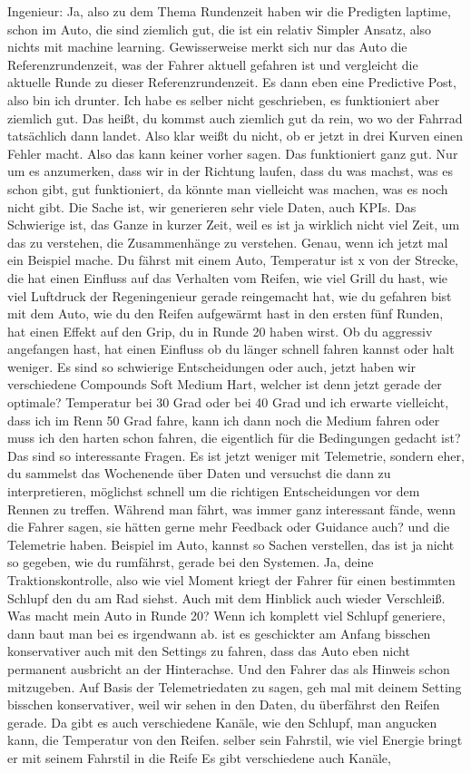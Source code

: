 Ingenieur: 
Ja, also zu dem Thema Rundenzeit haben wir die Predigten laptime, schon im Auto, die sind ziemlich gut, die ist ein relativ Simpler Ansatz, also nichts mit machine learning. Gewisserweise merkt sich nur das Auto die Referenzrundenzeit, was der Fahrer aktuell gefahren ist und vergleicht die aktuelle Runde zu dieser Referenzrundenzeit.  Es dann eben eine Predictive Post, also bin ich drunter. Ich habe es selber nicht geschrieben, es funktioniert aber ziemlich gut.  Das heißt, du kommst auch ziemlich gut da rein, wo  wo der Fahrrad tatsächlich dann landet. Also klar weißt du nicht, ob er jetzt in drei Kurven einen Fehler macht.  Also das kann keiner vorher sagen. Das funktioniert ganz gut. Nur um es anzumerken, dass wir in der Richtung laufen, dass  du was machst, was es schon gibt, gut funktioniert, da könnte man vielleicht was machen, was es noch nicht gibt. Die Sache ist, wir generieren sehr viele Daten, auch KPIs. Das Schwierige ist, das Ganze in kurzer Zeit, weil es ist ja wirklich nicht viel Zeit, um das zu verstehen, die Zusammenhänge zu verstehen.  Genau, wenn ich jetzt mal ein Beispiel mache.  Du fährst mit einem Auto, Temperatur ist x von der Strecke, die hat einen Einfluss auf das Verhalten vom Reifen, wie viel Grill du hast, wie  viel Luftdruck der Regeningenieur gerade reingemacht hat, wie du gefahren bist mit dem Auto, wie  du den Reifen aufgewärmt hast in den ersten fünf Runden, hat einen Effekt auf  den Grip, du in Runde 20 haben wirst. Ob du aggressiv angefangen hast, hat einen Einfluss ob du länger schnell fahren kannst oder halt weniger. Es sind so schwierige Entscheidungen oder auch, jetzt haben wir verschiedene Compounds Soft Medium Hart, welcher ist denn jetzt gerade der optimale? Temperatur bei 30 Grad oder bei 40 Grad und ich erwarte vielleicht, dass ich im Renn 50 Grad fahre, kann ich dann noch die Medium fahren oder muss ich den harten schon fahren, die eigentlich für die Bedingungen gedacht ist? Das sind so interessante Fragen. Es ist jetzt weniger mit Telemetrie, sondern eher, du sammelst das Wochenende über Daten und versuchst die dann zu interpretieren, möglichst schnell um die richtigen Entscheidungen vor dem Rennen zu treffen.  Während man fährt, was immer ganz interessant fände, wenn die Fahrer sagen, sie hätten gerne mehr Feedback oder Guidance auch?  und die Telemetrie haben. Beispiel im Auto, kannst so Sachen verstellen, das ist ja nicht so gegeben, wie du rumfährst, gerade bei den Systemen. Ja, deine Traktionskontrolle, also wie viel Moment kriegt der Fahrer für einen bestimmten Schlupf den du am Rad siehst.  Auch mit dem Hinblick auch wieder Verschleiß. Was macht mein Auto in Runde 20? Wenn  ich komplett viel Schlupf generiere, dann baut man bei es irgendwann ab. ist es geschickter am Anfang bisschen konservativer auch mit den Settings zu fahren, dass das Auto eben nicht permanent ausbricht an der Hinterachse.  Und den Fahrer das als Hinweis schon mitzugeben. Auf Basis der Telemetriedaten  zu sagen, geh mal mit deinem Setting bisschen konservativer, weil wir sehen in den Daten, du überfährst den Reifen gerade. Da gibt es auch verschiedene Kanäle, wie den Schlupf, man angucken kann, die Temperatur von den Reifen.  selber sein Fahrstil, wie viel Energie bringt er mit seinem Fahrstil in die Reife  Es gibt verschiedene  auch Kanäle, 